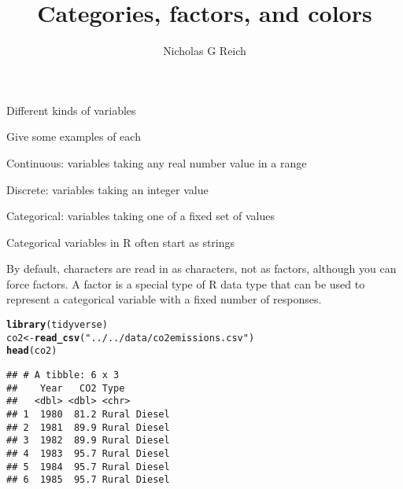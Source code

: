 \documentclass[table]{beamer}\usepackage[]{graphicx}\usepackage[]{color}
\title{Categories, factors, and colors}
\author{Nicholas G Reich}
\makeatletter
\newcommand{\hlstr}[1]{\textcolor[rgb]{0.192,0.494,0.8}{#1}}%
\newcommand{\hlstd}[1]{\textcolor[rgb]{0.345,0.345,0.345}{#1}}%
\newcommand{\hlkwb}[1]{\textcolor[rgb]{0.69,0.353,0.396}{#1}}%
\newcommand{\hlkwd}[1]{\textcolor[rgb]{0.737,0.353,0.396}{\textbf{#1}}}%
\newenvironment{kframe}{%
 \def\at@end@of@kframe{}%
 \ifinner\ifhmode%
  \def\at@end@of@kframe{\end{minipage}}%
  \begin{minipage}{\columnwidth}%
 \fi\fi%
 \def\FrameCommand##1{\hskip\@totalleftmargin \hskip-\fboxsep
 \colorbox{shadecolor}{##1}\hskip-\fboxsep
     \hskip-\linewidth \hskip-\@totalleftmargin \hskip\columnwidth}%
 \MakeFramed {\advance\hsize-\width
   \@totalleftmargin\z@ \linewidth\hsize
   \@setminipage}}%
 {\par\unskip\endMakeFramed%
 \at@end@of@kframe}
\newenvironment{knitrout}{}{} %
\makeatother
\begin{document}
\begin{frame}[plain]
	\titlepage
\end{frame}






\begin{frame}{Different kinds of variables}
\begin{block}{Give some examples of each}

\bi
    \item Continuous: variables taking any real number value in a range
    \vspace{4em}
    \item Discrete: variables taking an integer value
    \vspace{4em}
    \item Categorical: variables taking one of a fixed set of values
\ei

\end{block}

\end{frame}



\begin{frame}[fragile]{Categorical variables in R often start as strings}

By default, characters are read in as characters, not as factors, although you can force factors.
A factor is a special type of R data type that can be used to represent a categorical variable with a fixed number of responses.

\begin{knitrout}\tiny
{}\color{fgcolor}\begin{kframe}
\begin{alltt}
\hlkwd{library}\hlstd{(tidyverse)}
\hlstd{co2} \hlkwb{<-} \hlkwd{read_csv}\hlstd{(}\hlstr{"../../data/co2emissions.csv"}\hlstd{)}
\hlkwd{head}\hlstd{(co2)}
\end{alltt}
\begin{verbatim}
## # A tibble: 6 x 3
##    Year   CO2 Type        
##   <dbl> <dbl> <chr>       
## 1  1980  81.2 Rural Diesel
## 2  1981  89.9 Rural Diesel
## 3  1982  89.9 Rural Diesel
## 4  1983  95.7 Rural Diesel
## 5  1984  95.7 Rural Diesel
## 6  1985  95.7 Rural Diesel
\end{verbatim}
\end{kframe}
\end{knitrout}


\end{frame}
\end{document}
